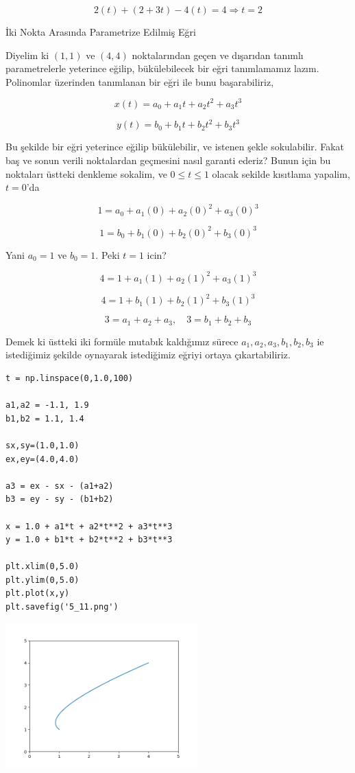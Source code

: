 \documentclass[12pt,fleqn]{article}\usepackage{../../common}
\begin{document}
$$ 2(t) + (2+3t)-4(t) = 4 \Rightarrow t = 2$$

İki Nokta Arasında Parametrize Edilmiş Eğri

Diyelim ki $(1,1)$ ve $(4,4)$ noktalarından geçen ve dışarıdan tanımlı
parametrelerle yeterince eğilip, bükülebilecek bir eğri tanımlamamız
lazım. Polinomlar üzerinden tanımlanan bir eğri ile bunu başarabiliriz, 

$$
x(t) = a_0 + a_1 t + a_2 t^2 + a_3 t^3
$$

$$
y(t) = b_0 + b_1 t + b_2 t^2 + b_3 t^3
$$

Bu şekilde bir eğri yeterince eğilip bükülebilir, ve istenen şekle
sokulabilir. Fakat baş ve sonun verili noktalardan geçmesini nasıl garanti
ederiz? Bunun için bu noktaları üstteki denkleme sokalim, ve $0 \le t \le
1$ olacak sekilde kısıtlama yapalim, $t=0$'da

$$
1 = a_0 + a_1 (0) + a_2 (0)^2 + a_3 (0)^3
$$

$$
1 = b_0 + b_1 (0) + b_2 (0)^2 + b_3 (0)^3
$$

Yani  $a_0=1$ ve $b_0=1$. Peki $t=1$ icin?

$$
4 = 1 + a_1 (1) + a_2 (1)^2 + a_3 (1)^3 
$$

$$
4 = 1 + b_1 (1) + b_2 (1)^2 + b_3 (1)^3 
$$

$$
3 = a_1 + a_2 + a_3, \quad 3 = b_1 + b_2 + b_3
$$

Demek ki üstteki iki formüle mutabık kaldığımız sürece
$a_1,a_2,a_3,b_1,b_2,b_3$ ie istediğimiz şekilde oynayarak istediğimiz
eğriyi ortaya çıkartabiliriz. 

\begin{verbatim}
t = np.linspace(0,1.0,100)

a1,a2 = -1.1, 1.9
b1,b2 = 1.1, 1.4

sx,sy=(1.0,1.0)
ex,ey=(4.0,4.0)

a3 = ex - sx - (a1+a2)
b3 = ey - sy - (b1+b2)

x = 1.0 + a1*t + a2*t**2 + a3*t**3
y = 1.0 + b1*t + b2*t**2 + b3*t**3

plt.xlim(0,5.0)
plt.ylim(0,5.0)
plt.plot(x,y)
plt.savefig('5_11.png')
\end{verbatim}

\includegraphics[width=20em]{5_11.png}
\end{document}
